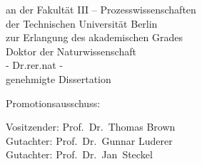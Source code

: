 \documentclass[a4paper,twoside,12pt,openright]{book}
\begin{document}
		\begin{center}
		\vspace*{\fill}
		an der Fakult\"at III -- Prozesswissenschaften\\
		der Technischen Universit\"at Berlin\\
		zur Erlangung des akademischen Grades\\
		\vspace*{\fill}
		Doktor der Naturwissenschaft\\
		- Dr.rer.nat - \\[1ex]
		genehmigte Dissertation
		\end{center}
		

%
%	
%		
		\vspace*{\fill}

		\begin{flushleft}
		Promotionsausschuss:
		
				
		\qquad Vositzender: Prof.\ Dr.\ Thomas Brown\\
		\qquad Gutachter: Prof.\ Dr.\ Gunnar Luderer\\
		\qquad Gutachter: Prof.\ Dr.\ Jan\ Steckel\\
			\end{flushleft}
		
\end{document}
